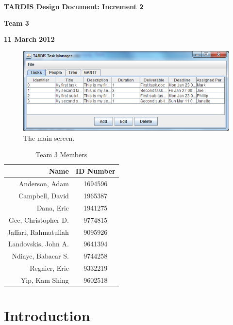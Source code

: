 \documentclass[12pt]{article}
\begin{document}
\vspace*{0.3in}
\centerline{\bf\Large TARDIS Design Document: Increment 2}

\vspace*{0.5in}
\centerline{\bf\Large Team 3}

\vspace*{0.5in}
\centerline{\bf\Large 11 March 2012}
\vspace*{0.5in}

\begin{figure}[H]
\includegraphics{diagrams/screenshot.png}
\caption{The main screen.}
\end{figure}


\begin{table}[htbp]
\caption{Team 3 Members}
\begin{center}
\begin{tabular}{|r | c|}
\hline
Name & ID Number \\
\hline\hline
Anderson, Adam & 1694596\\
Campbell, David& 1965387\\
Dana, Eric & 1941275\\
Gee, Christopher D.& 9774815\\
Jaffari, Rahmatullah & 9095926\\
Landovskis, John A. & 9641394\\
Ndiaye, Babacar S. & 9744258\\
Regnier, Eric & 9332219\\
Yip, Kam Shing & 9602518\\
\hline
\end{tabular}
\end{center}
\end{table}

\clearpage

\tableofcontents

\pagebreak

\section{Introduction}
\vspace*{0.1in}
\end{document}
